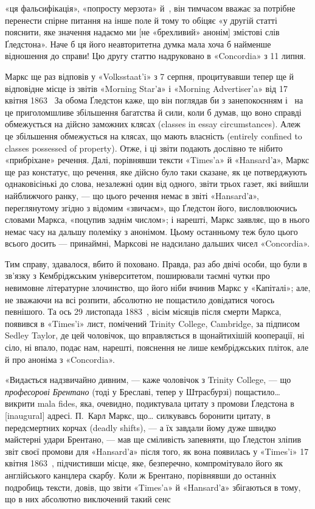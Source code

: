 \parcont{}  %
«ця фальсифікація», «попросту мерзота» й~, він тимчасом
вважає за потрібне перенести спірне питання на інше поле й тому
то обіцяє «у другій статті пояснити, яке значення надаємо ми
[не «брехливий» анонім] змістові слів Ґледстона». Наче б ця
його неавторитетна думка мала хоча б найменше відношення до
справи! Цю другу статтю надруковано в «Concordia» з 11 липня.

Маркс ще раз відповів у «Volksstaat’i» з 7 серпня, процитувавши
тепер ще й відповідне місце із звітів «Morning Star’а» і
«Morning Advertiser’a» від 17 квітня 1863~ За обома Ґледстон
каже, що він поглядав би з занепокоєнням і~ на це приголомшливе
збільшення багатства й сили, коли б думав, що воно
справді обмежується на дійсно заможних клясах (classes in essay
circumstances). Алеж це збільшення обмежується на клясах,
що мають власність (entirely confined to classes possessed of
property). Отже, і ці звіти подають дослівно те нібито «прибріхане»
речення. Далі, порівнявши тексти «Times’a» й «Hansard’а»,
Маркс ще раз констатує, що речення, яке дійсно було
таки сказане, як це потверджують однаковісінькі до слова, незалежні
один від одного, звіти трьох газет, які вийшли найближчого
ранку, — що цього речення немає в звіті «Hansard’а», переглянутому
згідно з відомим «звичаєм», що Ґледстон його,
висловлюючись словами Маркса, «поцупив заднім числом»; і
нарешті, Маркс заявляє, що в нього немає часу на дальшу полеміку
з анонімом. Цьому останньому теж було цього всього досить —
принаймні, Марксові не надсилано дальших чисел «Concordia».

Тим справу, здавалося, вбито й поховано. Правда, раз або
двічі особи, що були в зв’язку з Кембріджським університетом,
поширювали таємні чутки про невимовне літературне злочинство,
що його ніби вчинив Маркс у «Капіталі»; але, не зважаючи на
всі розпити, абсолютно не пощастило довідатися чогось певнішого.
Та ось 29 листопада 1883~, вісім місяців після смерти
Маркса, появився в «Times’i» лист, помічений Trinity College,
Cambridge, за підписом Sedley Taylor, де цей чоловічок, що вправляється
в щонайтихішій кооперації, ні сіло, ні впало, подає нам,
нарешті, пояснення не лише кембріджських пліток, але й про
аноніма з «Concordia».

«Видається надзвичайно дивним, — каже чоловічок з Trinity
College, — що \emph{професорові Брентано} (тоді у Бреславі, тепер у
Штрасбурзі) пощастило\dots{} викрити mala fides, яка, очевидно,
подиктувала цитату з промови Ґледстона в [inaugural] адресі.
П.~Карл Маркс, що\dots{} силкувавсь боронити цитату, в передсмертних
корчах (deadly shifts), — а їх завдали йому дуже швидко
майстерні удари Брентано, — мав ще сміливість запевняти, що
Ґледстон зліпив звіт своєї промови для «Hansard’а» після того,
як вона появилась у «Times’i» 17 квітня 1863~, підчистивши
місце, яке, безперечно, компромітувало його як англійського
канцлера скарбу. Коли ж Брентано, порівнявши до останніх
подробиць тексти, довів, що звіти «Times’a» й «Hansard’а» збігаються
в тому, що в них абсолютно виключений такий сенс
\parbreak{}  %
